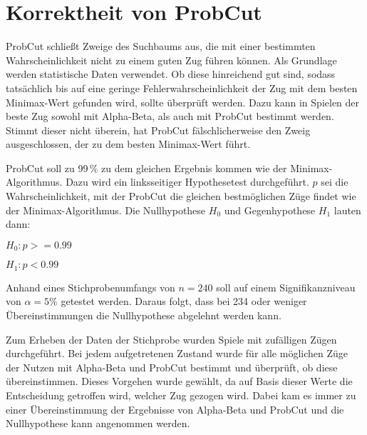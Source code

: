 
\section{Korrektheit von ProbCut}
ProbCut schließt Zweige des Suchbaums aus, die mit einer bestimmten Wahrscheinlichkeit nicht zu einem guten Zug führen
können. Als Grundlage werden statistische Daten verwendet. Ob diese hinreichend gut sind, sodass tatsächlich bis auf
eine geringe Fehlerwahrscheinlichkeit der Zug mit dem besten Minimax-Wert gefunden wird, sollte überprüft werden. Dazu
kann in Spielen der beste Zug sowohl mit Alpha-Beta, als auch mit ProbCut bestimmt werden. Stimmt dieser nicht überein,
hat ProbCut fälschlicherweise den Zweig ausgeschlossen, der zu dem besten Minimax-Wert führt.

ProbCut soll zu 99\,\% zu dem gleichen Ergebnis kommen wie der Minimax-Algorithmus. Dazu wird ein linksseitiger
Hypothesetest durchgeführt. $p$ sei die Wahrscheinlichkeit, mit der ProbCut die gleichen bestmöglichen Züge findet wie
der Minimax-Algorithmus. Die Nullhypothese $H_0$ und Gegenhypothese $H_1$ lauten dann:

\hspace*{1.3cm}
$H_0:p>=0.99$

\hspace*{1.3cm}
$H_1:p<0.99$

Anhand eines Stichprobenumfangs von $n=240$ soll auf einem Signifikanzniveau von $\alpha=5\%$ getestet werden. Daraus
folgt, dass bei 234 oder weniger Übereinstimmungen die Nullhypothese abgelehnt werden kann.

Zum Erheben der Daten der Stichprobe wurden Spiele mit zufälligen Zügen durchgeführt. Bei jedem aufgetretenen Zustand
wurde für alle möglichen Züge der Nutzen mit Alpha-Beta und ProbCut bestimmt und überprüft, ob diese übereinstimmen.
Dieses Vorgehen wurde gewählt, da auf Basis dieser Werte die Entscheidung getroffen wird, welcher Zug gezogen wird.
Dabei kam es immer zu einer Übereinstimmung der Ergebnisse von Alpha-Beta und ProbCut und die Nullhypothese kann
angenommen werden.
